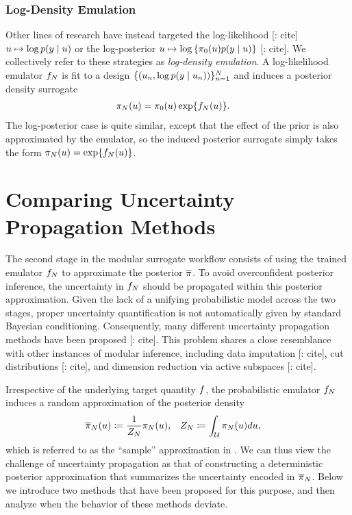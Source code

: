 \documentclass[12pt]{article}
\begin{document}
\subsubsection{Log-Density Emulation}
Other lines of research have instead targeted the log-likelihood [\todo: cite]
$u \mapsto \log p(y \mid u)$ or the log-posterior 
$u \mapsto \log \left\{\pi_0(u)p(y \mid u)\right\}$ [\todo: cite].
We collectively refer to these strategies as \textit{log-density emulation}. A log-likelihood
emulator $f_{N}$ is fit to a design $\{(u_n, \log p(y \mid u_n))\}_{n=1}^{N}$
and induces a posterior density surrogate 
\begin{align}
\pi_{N}(u) &= \pi_0(u) \exp\mathopen{}\left\{f_{N}(u)\right\}\mathclose{}. \label{eq:post-em-llik}
\end{align}
The log-posterior case is quite similar, except that the effect of the prior is also 
approximated by the emulator, so the induced posterior surrogate simply takes 
the form $\pi_{N}(u) = \exp\mathopen{}\left\{f_{N}(u)\right\}\mathclose{}$.

\section{Comparing Uncertainty Propagation Methods}
The second stage in the modular surrogate workflow consists of using the 
trained emulator $f_{N}$ to approximate the posterior $\overline{\pi}$.
To avoid overconfident posterior inference, the uncertainty in $f_{N}$
should be propagated within this posterior approximation. Given the lack of
a unifying probabilistic model across the two stages, proper uncertainty 
quantification is not automatically given by standard Bayesian conditioning.
Consequently, many different uncertainty propagation methods have been 
proposed [\todo: cite]. This problem shares a close resemblance with other 
instances of modular inference, including data imputation [\todo: cite],
cut distributions [\todo: cite], and dimension reduction via active subspaces [\todo: cite].

Irrespective of the underlying target quantity $f$, the probabilistic emulator $f_{N}$ 
induces a random approximation of the posterior density
\begin{align}
\overline{\pi}_{N}(u) &\coloneqq \frac{1}{Z_{N}} \pi_{N}(u),
&&Z_{N} \coloneqq \int_{\mathcal{U}} \pi_{N}(u) du, \label{eq:random-post}
\end{align}
which is referred to as the ``sample'' approximation in \citet{StuartTeck1}. We can thus
view the challenge of uncertainty propagation as that of constructing a deterministic 
posterior approximation that summarizes the uncertainty encoded in $\overline{\pi}_{N}$.
Below we introduce two methods that have been proposed for this purpose, and then
analyze when the behavior of these methods deviate. 
\end{document}
